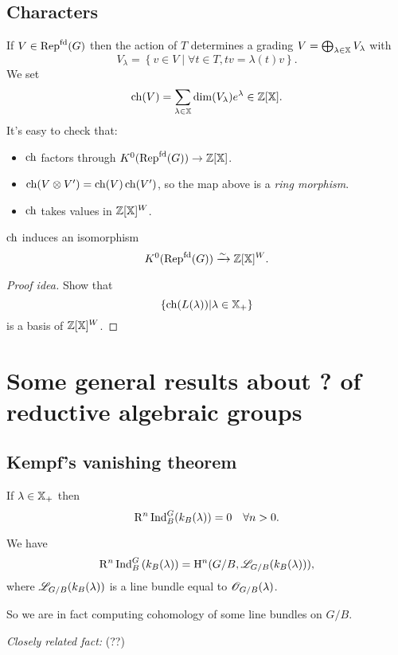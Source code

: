 \subsection{Characters}
If $V\in \operatorname{Rep}^{\text{fd}}(G)$ then the action of $T$ determines a grading $V=\bigoplus_{\lambda\in \mathbb{X}}V_\lambda$ with
\[
V_\lambda = \left\{ v\in V \middle| \forall t\in T,tv = \lambda(t)v \right\} .
\] 
We set
\[
	\operatorname{ch}(V) = \sum_{\lambda\in \mathbb{X}}\dim(V_\lambda)e^{\lambda}\in \mathbb Z[\mathbb{X}].
\] 
It's easy to check that:
\begin{itemize}
	\item $\operatorname{ch}$ factors through $K^{0}(\Repf(G))\to \Z[\XX]$.
	\item $\operatorname{ch}(V\otimes V') = \operatorname{ch}(V)\operatorname{ch}(V')$, so the map above is a \emph{ring morphism}.
	\item $\operatorname{ch}$ takes values in $\mathbb Z[\mathbb{X}]^{W}$.
\end{itemize}
\begin{proposition}
	$\operatorname{ch}$ induces an isomorphism
	\[
		K^{0}(\operatorname{Rep}^{\text{fd}}(G)) \xrightarrow{\sim} \mathbb Z[\mathbb{X}]^{W}.
	\] 
\end{proposition}
\begin{proof}[Proof idea]
	Show that
	\[
	\left\{ \operatorname{ch}(L(\lambda)) \middle| \lambda\in \mathbb{X}_+ \right\} 
	\] 
	is a basis of $\mathbb Z[\mathbb{X}]^{W}$.
\end{proof}

\section{Some general results about ? of reductive algebraic groups}
\subsection{Kempf's vanishing theorem}
\begin{theorem}
	If $\lambda\in \mathbb{X}_+$ then
	\[
	\mathrm{R}^{n}\operatorname{Ind}_B^{G}(k_B(\lambda)) = 0 \quad \forall n>0.
	\] 
\end{theorem}
\begin{note}
	We have
	\[
	\mathrm{R}^{n}\operatorname{Ind}_B^{G}\left( k_B(\lambda) \right) = \mathrm{H}^{n}(G /B, \mathscr{L}_{G /B}(k_B(\lambda))),
	\] 
	where $\mathscr{L}_{G /B}(k_B(\lambda))$ is a line bundle equal to $\mathscr{O}_{G /B}(\lambda)$.
\end{note}
So we are in fact computing cohomology of some line bundles on $G /B$.

\emph{Closely related fact:} (??)

